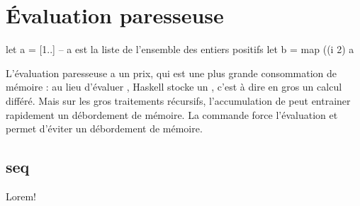 \section{Évaluation paresseuse}

\begin{haskellcode}
let a = [1..] -- a est la liste de l'ensemble des entiers positifs
let b = map ((^^) 2) a
\end{haskellcode}

L'évaluation paresseuse a un prix, qui est une plus grande consommation de
mémoire : au lieu d'évaluer , Haskell stocke un , c'est
à dire en gros un calcul différé. Mais sur les gros traitements récursifs,
l'accumulation de  peut entrainer rapidement un
débordement de mémoire. La commande  force l'évaluation et permet
d'éviter un débordement de mémoire.

\subsection[]{seq}

Lorem!
